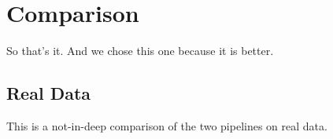 \section{Comparison}
\label{sec:comparison}

So that's it. And we chose this one because it is better.

\subsection{Real Data}

This is a not-in-deep comparison of the two pipelines on real data.

